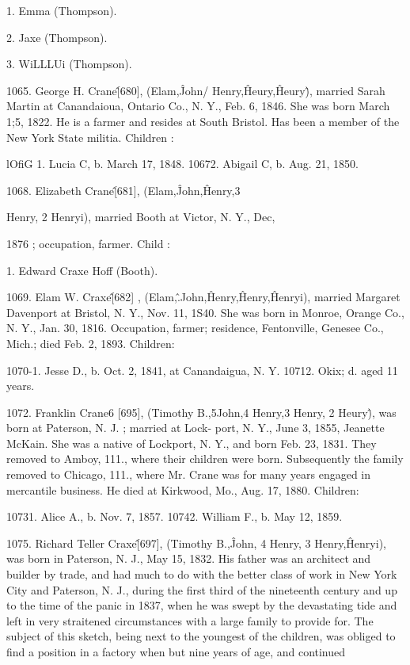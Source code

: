 1. Emma (Thompson). 

2. Jaxe (Thompson). 

3. WiLLLUi (Thompson). 

1065. George H. Crane\^ [680], (Elam,\^ John/ Henry,\^ 
Heury,\^ Heury\^), married Sarah Martin at Canandaioua, Ontario 
Co., N. Y., Feb. 6, 1846. She was born March 1;5, 1822. He 
is a farmer and resides at South Bristol. Has been a member of 
the New York State militia. Children : 

lOfiG 1. Lucia C, b. March 17, 1848. 
10672. Abigail C, b. Aug. 21, 1850. 

1068. Elizabeth Crane\^ [681], (Elam,\^ John,\^ Henry,3 

Henry, 2 Henryi), married Booth at Victor, N. Y., Dec, 

1876 ; occupation, farmer. Child : 

1. Edward Craxe Hoff (Booth). 

1069. Elam W. Craxe\^ [682] , (Elam,\^ .John,\^ Henry,\^ Henry,\^ 
Henryi), married Margaret Davenport at Bristol, N. Y., Nov. 
11, 1S40. She was born in Monroe, Orange Co., N. Y., Jan. 
30, 1816. Occupation, farmer; residence, Fentonville, Genesee 
Co., Mich.; died Feb. 2, 1893. Children: 

1070-1. Jesse D., b. Oct. 2, 1841, at Canandaigua, N. Y. 
10712. Okix; d. aged 11 years. 

1072. Franklin Crane6 [695], (Timothy B.,5John,4 Henry,3 
Henry, 2 Heury\^), was born at Paterson, N. J. ; married at Lock- 
port, N. Y., June 3, 1855, Jeanette McKain. She was a native 
of Lockport, N. Y., and born Feb. 23, 1831. They removed 
to Amboy, 111., where their children were born. Subsequently the 
family removed to Chicago, 111., where Mr. Crane was for many 
years engaged in mercantile business. He died at Kirkwood, 
Mo., Aug. 17, 1880. Children: 

10731. Alice A., b. Nov. 7, 1857. 
10742. William F., b. May 12, 1859. 

1075. Richard Teller Craxe\^ [697], (Timothy B.,\^ John, 4 
Henry, 3 Henry,\^ Henryi), was born in Paterson, N. J., May 15, 
1832. His father was an architect and builder by trade, and had 
much to do with the better class of work in New York City and 
Paterson, N. J., during the first third of the nineteenth century 
and up to the time of the panic in 1837, when he was swept by 
the devastating tide and left in very straitened circumstances 
with a large family to provide for. The subject of this sketch, 
being next to the youngest of the children, was obliged to find a 
position in a factory when but nine years of age, and continued 




